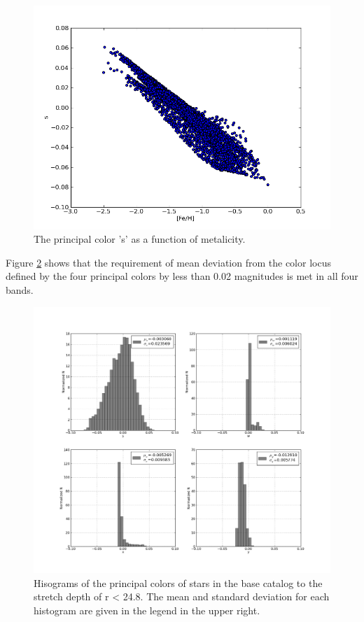 \documentclass[]{article}
\begin{document}
{\begin{figure}[H]
\centering
\includegraphics[width=5in]{validation_figures/s_met.png}
\caption{The principal color 's' as a function of metalicity.\label{fig:sfeh}}
\end{figure}


Figure \ref{fig:principalcolorshist} shows that the requirement of mean deviation from the color locus defined by the four principal colors by less than 
0.02 magnitudes is met in all four bands.
\begin{figure}[H]
\centering
\includegraphics[width=5in]{validation_figures/principal_colors_hist.png}
\caption{Hisograms of the principal colors of stars in the base catalog to the stretch depth of r < 24.8. The mean and standard deviation for each 
histogram are given in the legend in the upper right.\label{fig:principalcolorshist}}
\end{figure}

}
\end{document}
